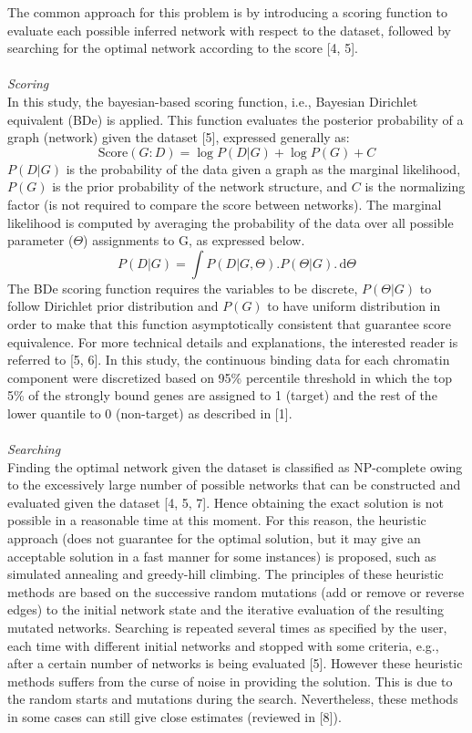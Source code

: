 \documentclass{bioinfo}
\begin{document}
\begin{methods}
The common approach for this problem is by introducing a scoring function to evaluate each possible inferred network with respect to the dataset, followed by searching for the optimal network according to the score [4, 5]. \\
\\
\textit{Scoring}\\
In this study, the bayesian-based scoring function, i.e., Bayesian Dirichlet equivalent (BDe) is applied. This function evaluates the posterior probability of a graph (network) given the dataset [5], expressed generally as:\\
 \[ 
 \text{Score}(G:D) = \log P(D|G) + \log P(G) + C 
 \]
\(P(D|G)\) is the probability of the data given a graph as the marginal likelihood, \(P(G)\) is the prior probability of the network structure, and \(C\) is the normalizing factor (is not required to compare the score between networks). The marginal likelihood is computed by averaging the probability of the data over all possible parameter (\(\Theta\)) assignments to G, as expressed below.\\
 \[
 P(D|G) = \int P(D|G,\Theta).P(\Theta|G).\,\mathrm{d}\Theta
 \]
 The BDe scoring function requires the variables to be discrete, \(P(\Theta|G)\) to follow Dirichlet prior distribution and \(P(G)\) to have uniform distribution in order to make that this function asymptotically consistent that guarantee score equivalence. For more technical details and explanations, the interested reader is referred to [5, 6]. In this study, the continuous binding data for each chromatin component were discretized based on 95\% percentile threshold in which the top 5\% of the strongly bound genes are assigned to 1 (target) and the rest of the lower quantile to 0 (non-target) as described in [1].\\
 \\
\textit{Searching}\\
Finding the optimal network given the dataset is classified as NP-complete  owing to the excessively large number of possible networks that can be constructed and evaluated given the dataset [4, 5, 7]. Hence obtaining the exact solution is not possible in a reasonable time at this moment. For this reason, the heuristic approach (does not guarantee for the optimal solution, but it may give an acceptable solution in a fast manner for some instances) is proposed, such as simulated annealing and greedy-hill climbing. The principles of these heuristic methods are based on the successive random mutations (add or remove or reverse edges) to the initial network state and the iterative evaluation of the resulting mutated networks. Searching is repeated several times as specified by the user, each time with different initial networks and stopped with some criteria, e.g., after a certain number of networks is being evaluated [5]. However these heuristic methods suffers from the curse of noise in providing the solution. This is due to the random starts and mutations during the search. Nevertheless, these methods in some cases can still give close estimates (reviewed in [8]). 
 

\end{methods}
\end{document}

